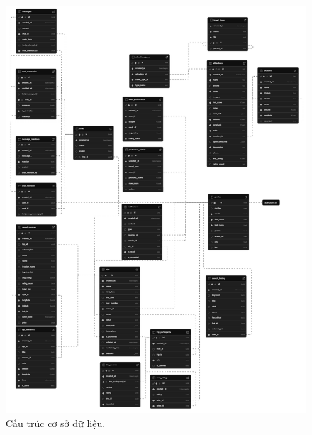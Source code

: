 \begin{figure}[H]
    \centering  
    \includegraphics[width=1.1\textwidth]{figures/c3/test2.png}
    \caption{Cấu trúc cơ sở dữ liệu.}
    \label{fig:3-4-database}
\end{figure}

